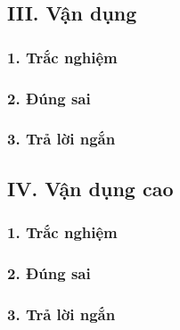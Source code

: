\subsection*{III. Vận dụng}

\subsubsection*{1. Trắc nghiệm}

\subsubsection*{2. Đúng sai}

\subsubsection*{3. Trả lời ngắn}

\subsection*{IV. Vận dụng cao}

\subsubsection*{1. Trắc nghiệm}

\subsubsection*{2. Đúng sai}

\subsubsection*{3. Trả lời ngắn}